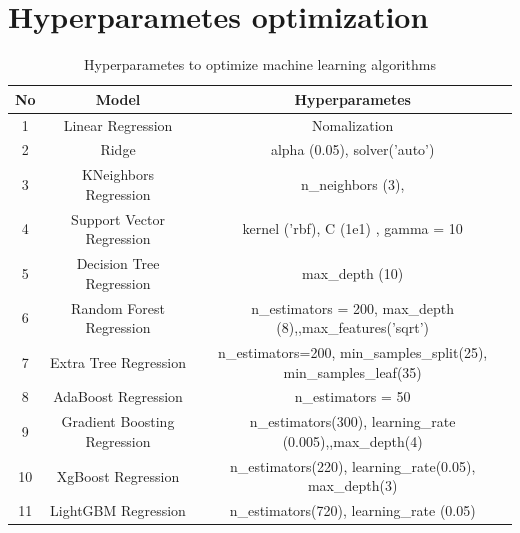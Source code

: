 \documentclass[12pt,a4paper]{report}
\begin{document}
\chapter{Hyperparametes optimization}

\begin{table}[H]
\caption{Hyperparametes to optimize machine learning algorithms}
\centering
\begin{adjustbox}{width=1\textwidth}
\small
\begin{tabular}{|c|c|c|}
\hline
\textbf{No} & \textbf{Model}               & \textbf{Hyperparametes}                                            \\ \hline
1           & Linear Regression            & Nomalization                                                       \\ \hline
2           & Ridge                        & alpha (0.05), solver('auto')                                       \\ \hline
3           & KNeighbors Regression        & n\_neighbors (3),                                                  \\ \hline
4           & Support Vector Regression    & kernel ('rbf), C (1e1) , gamma = 10                                \\ \hline
5           & Decision Tree Regression     & max\_depth (10)                                                    \\ \hline
6           & Random Forest Regression     & n\_estimators = 200, max\_depth (8),,max\_features('sqrt')         \\ \hline
7           & Extra Tree Regression        & n\_estimators=200, min\_samples\_split(25), min\_samples\_leaf(35) \\ \hline
8           & AdaBoost Regression          & n\_estimators = 50                                                 \\ \hline
9           & Gradient Boosting Regression & n\_estimators(300), learning\_rate (0.005),,max\_depth(4)          \\ \hline
10          & XgBoost Regression           & n\_estimators(220), learning\_rate(0.05), max\_depth(3)            \\ \hline
11          & LightGBM Regression          & n\_estimators(720), learning\_rate (0.05)                          \\ \hline
\end{tabular}
\end{adjustbox}
\end{table}
\end{document}

